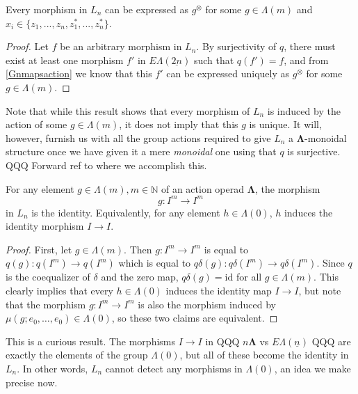 \documentclass{amsbook} %
\newcommand{\id}{\textrm{id}}
\newcommand{\ML}{\mathbf{\Lambda}}
\newcommand{\ELn}{E\Lambda(\underline{n})}
\newcommand{\ELnn}{E\Lambda(\underline{2n})}
\numberwithin{section}{chapter}
\begin{document}
\begin{lem} \label{allmapsaction} Every morphism in $L_n$ can be expressed as $g^{\otimes}$
for some $g \in \Lambda(m)$ and $x_i \in \{z_1, ..., z_n, z_1^*, ..., z_n^* \}$.
\end{lem}
\begin{proof}
Let $f$ be an arbitrary morphism in $L_n$. By surjectivity of $q$, there must exist at least one morphism $f'$ in $\ELnn$ such that $q(f') = f$, and from \cref{Gnmapsaction} we know that this $f'$ can be expressed uniquely as $g^{\otimes}$ for some $g \in \Lambda(m)$. 
\end{proof}


Note that while this result shows that every morphism of $L_n$ is induced by the action of some $g \in \Lambda(m)$, it does not imply that this $g$ is unique. It will, however, furnish us with all the group actions required to give $L_n$ a $\ML$-monoidal structure once we have given it a mere \emph{monoidal} one using that $q$ is surjective.  QQQ Forward ref to where we accomplish this.

\begin{lem} \label{noscalar} For any element $g \in \Lambda(m), m \in \mathbb{N}$ of an action operad $\ML$, the morphism
\[
g: I^m \to I^m
\]
in $L_n$ is the identity.
Equivalently, for any element $h \in \Lambda(0)$, $h$ induces the identity morphism $I \to I$.
\end{lem}
\begin{proof}
First, let $g \in \Lambda(m)$. Then $g: I^m \to I^m$ is equal to $q(g):q(I^m) \to q(I^m)$ which is equal to $q\delta(g): q\delta(I^m) \to q\delta(I^m)$. Since $q$ is the coequalizer of $\delta$ and the zero map, $q\delta(g) = \id$ for all $g \in \Lambda(m)$. This clearly implies that every $h \in \Lambda(0)$ induces the identity map $I \to I$, but note that the morphism $g:I^m \to I^m$ is also the morphism induced by $\mu(g; e_0, \ldots, e_0) \in \Lambda(0)$, so these two claims are equivalent.
\end{proof}

This is a curious result. The morphisms $I \to I$ in QQQ $n\ML$ vs $\ELn$ QQQ are exactly the elements of the group $\Lambda(0)$, but all of these become the identity in $L_n$. In other words, $L_n$ cannot detect any morphisms in $\Lambda(0)$, an idea we make precise now. 
\end{document}
